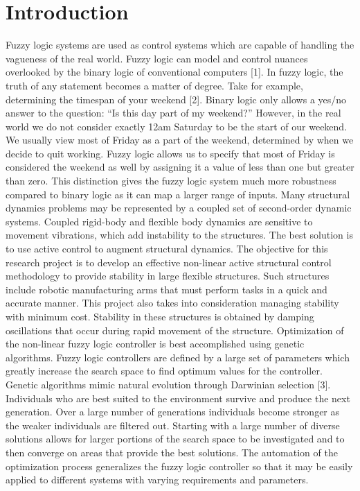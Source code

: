 \documentclass[submit]{aiaa-tc}
\begin{document}
\section{Introduction}
Fuzzy logic systems are used as control systems which are capable of handling the vagueness of the real world. Fuzzy logic can model and control nuances overlooked by the binary logic of conventional computers [1]. In fuzzy logic, the truth of any statement becomes a matter of degree. Take for example, determining the timespan of your weekend [2]. Binary logic only allows a yes/no answer to the question: “Is this day part of my weekend?” However, in the real world we do not consider exactly 12am Saturday to be the start of our weekend. We usually view most of Friday as a part of the weekend, determined by when we decide to quit working. Fuzzy logic allows us to specify that most of Friday is considered the weekend as well by assigning it a value of less than one but greater than zero. This distinction gives the fuzzy logic system much more robustness compared to binary logic as it can map a larger range of inputs.
        Many structural dynamics problems may be represented by a coupled set of second-order dynamic systems. Coupled rigid-body and flexible body dynamics are sensitive to movement vibrations, which add instability to the structures. The best solution is to use active control to augment structural dynamics.
        The objective for this research project is to develop an effective non-linear active structural control methodology to provide stability in large flexible structures. Such structures include robotic manufacturing arms that must perform tasks in a quick and accurate manner. This project also takes into consideration managing stability with minimum cost. Stability in these structures is obtained by damping oscillations that occur during rapid movement of the structure.
        Optimization of the non-linear fuzzy logic controller is best accomplished using genetic algorithms. Fuzzy logic controllers are defined by a large set of parameters which greatly increase the search space to find optimum values for the controller. Genetic algorithms mimic natural evolution through Darwinian selection [3]. Individuals who are best suited to the environment survive and produce the next generation. Over a large number of generations individuals become stronger as the weaker individuals are filtered out. Starting with a large number of diverse solutions allows for larger portions of the search space to be investigated and to then converge on areas that provide the best solutions. The automation of the optimization process generalizes the fuzzy logic controller so that it may be easily applied to different systems with varying requirements and parameters.
 

 
\end{document}

